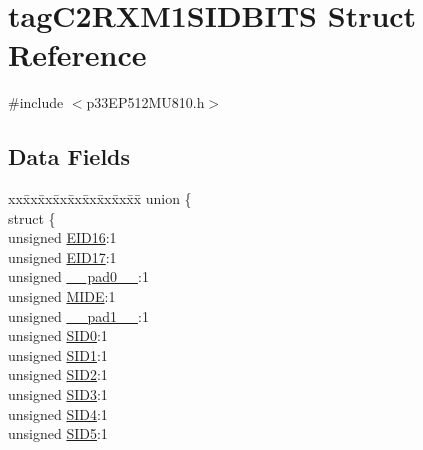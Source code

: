 \hypertarget{structtag_c2_r_x_m1_s_i_d_b_i_t_s}{}\section{tag\+C2\+R\+X\+M1\+S\+I\+D\+B\+I\+TS Struct Reference}
\label{structtag_c2_r_x_m1_s_i_d_b_i_t_s}


{\ttfamily \#include $<$p33\+E\+P512\+M\+U810.\+h$>$}

\subsection*{Data Fields}
\begin{DoxyCompactItemize}
\item 
\begin{tabbing}
xx\=xx\=xx\=xx\=xx\=xx\=xx\=xx\=xx\=\kill
union \{\\
\>struct \{\\
\>\>unsigned \hyperlink{structtag_c2_r_x_m1_s_i_d_b_i_t_s_a6dd5663b0c9838c56db040560ca0efa1}{EID16}:1\\
\>\>unsigned \hyperlink{structtag_c2_r_x_m1_s_i_d_b_i_t_s_aa648615464b0eb29967529333eee9fd9}{EID17}:1\\
\>\>unsigned \hyperlink{structtag_c2_r_x_m1_s_i_d_b_i_t_s_adf71f3d8410c1f1dbbc96680a92c49af}{\_\_pad0\_\_}:1\\
\>\>unsigned \hyperlink{structtag_c2_r_x_m1_s_i_d_b_i_t_s_a3febd6bba68dc9477425e6ef6020e88a}{MIDE}:1\\
\>\>unsigned \hyperlink{structtag_c2_r_x_m1_s_i_d_b_i_t_s_acaf2d0924a107ec6e8d2e31febaf66f9}{\_\_pad1\_\_}:1\\
\>\>unsigned \hyperlink{structtag_c2_r_x_m1_s_i_d_b_i_t_s_a1ca276ac15df60e1f7b9a6d0011ade93}{SID0}:1\\
\>\>unsigned \hyperlink{structtag_c2_r_x_m1_s_i_d_b_i_t_s_a3405d354f81391f879648f69f504dfc8}{SID1}:1\\
\>\>unsigned \hyperlink{structtag_c2_r_x_m1_s_i_d_b_i_t_s_ad744966dfc49307f731b7045b01b94e5}{SID2}:1\\
\>\>unsigned \hyperlink{structtag_c2_r_x_m1_s_i_d_b_i_t_s_a9345f3e64720be93e83d8dfc827f3f45}{SID3}:1\\
\>\>unsigned \hyperlink{structtag_c2_r_x_m1_s_i_d_b_i_t_s_aefb106fed4bb40e2c3c71ac612c554e3}{SID4}:1\\
\>\>unsigned \hyperlink{structtag_c2_r_x_m1_s_i_d_b_i_t_s_a0f221b3c9612231686bf87ccdcec8489}{SID5}:1\\

\end{tabbing}
\end{DoxyCompactItemize}
